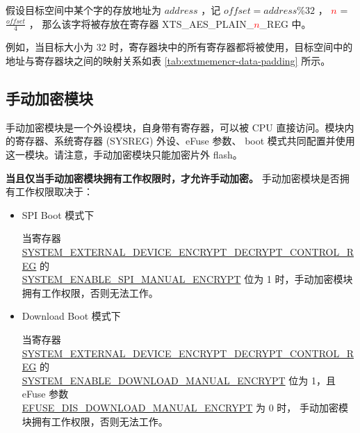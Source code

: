\documentclass[main\_\_CN.tex]{subfiles}
\begin{document}
假设目标空间中某个字的存放地址为 \begin{math} address \end{math} ，记  \begin{math} offset = address \% 32 \end{math} ，
    \textcolor{red}{\it{$n$}} =  \begin{math} \frac{offset}{4} \end{math} ， 那么该字将被存放在寄存器 XTS\_AES\_PLAIN\_\textcolor{red}{\it{$n$}}\_REG 中。

例如，当目标大小为 32 时，寄存器块中的所有寄存器都将被使用，目标空间中的地址与寄存器块之间的映射关系如表 \ref{tab:extmemencr-data-padding} 所示。



\subsection{手动加密模块}

手动加密模块是一个外设模块，自身带有寄存器，可以被 CPU 直接访问。模块内的寄存器、系统寄存器 (SYSREG) 外设、eFuse 参数、 boot 模式共同配置并使用这一模块。请注意，手动加密模块只能加密片外 flash。

\textbf{ 当且仅当手动加密模块拥有工作权限时，才允许手动加密。}  手动加密模块是否拥有工作权限取决于：

\begin{itemize}

    \item SPI Boot 模式下
    
    当寄存器 \hyperref[regdesc:SYSTEMEXTERNALDEVICEENCRYPTDECRYPTCONTROLREG]{SYSTEM\_EXTERNAL\_DEVICE\_ENCRYPT\_DECRYPT\_CONTROL\_REG} 的 \\ \hyperref[fielddesc:SYSTEMENABLESPIMANUALENCRYPT]{SYSTEM\_ENABLE\_SPI\_MANUAL\_ENCRYPT} 位为 1 时，手动加密模块拥有工作权限，否则无法工作。
    
    \item Download Boot 模式下
    
    当寄存器 \hyperref[regdesc:SYSTEMEXTERNALDEVICEENCRYPTDECRYPTCONTROLREG]{SYSTEM\_EXTERNAL\_DEVICE\_ENCRYPT\_DECRYPT\_CONTROL\_REG} 的\\ \hyperref[fielddesc:SYSTEMENABLEDOWNLOADMANUALENCRYPT]{SYSTEM\_ENABLE\_DOWNLOAD\_MANUAL\_ENCRYPT} 位为 1，且 eFuse 参数\\ \hyperref[fielddesc:EFUSEDISDOWNLOADMANUALENCRYPT]{EFUSE\_DIS\_DOWNLOAD\_MANUAL\_ENCRYPT} 为 0 时，
    手动加密模块拥有工作权限，否则无法工作。
    
\end{itemize}
\end{document}

